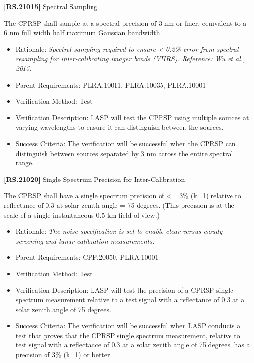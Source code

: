 \documentclass[12pt,oneside,oldfontcommands]{memoir}
\begin{document}
\textbf{[RS.21015]} Spectral Sampling

The \gls{CPRSP} shall \gls{sample} at a spectral precision of 3 nm or finer, equivalent to a 6 nm full width half maximum Gaussian bandwidth.

\begin{itemize}
\item{} Rationale: \emph{Spectral sampling required to ensure < 0.2\% error from spectral resampling for inter-calibrating imager bands (VIIRS). Reference: Wu et al., 2015.}

\item{} Parent Requirements: PLRA.10011, PLRA.10035, PLRA.10001

\item{} Verification Method: Test

\item{} Verification Description: \gls{LASP} will \gls{test} the \gls{CPRSP} using multiple sources at varying wavelengths to ensure it can distinguish between the sources.

\item{} Success Criteria: The verification will be successful when the \gls{CPRSP} can distinguish between sources separated by 3 nm across the entire spectral range.

\end{itemize}

\textbf{[RS.21020]} Single Spectrum Precision for Inter-Calibration

The \gls{CPRSP} shall have a single spectrum precision of <= 3\% (k=1) relative to reflectance of 0.3 at solar zenith angle = 75 degrees. (This precision is at the scale of a single instantaneous 0.5 km field of view.)

\begin{itemize}
\item{} Rationale: \emph{The noise specification is set to enable clear versus cloudy screening and lunar calibration measurements.}

\item{} Parent Requirements: \gls{CPF}.20050, PLRA.10001

\item{} Verification Method: Test

\item{} Verification Description: \gls{LASP} will \gls{test} the precision of a \gls{CPRSP} single spectrum \gls{measure}ment relative to a \gls{test} signal with a reflectance of 0.3 at a solar zenith angle of 75 degrees.

\item{} Success Criteria: The verification will be successful when \gls{LASP} conducts a \gls{test} that proves that the \gls{CPRSP} single spectrum \gls{measure}ment, relative to \gls{test} signal with a reflectance of 0.3 at a solar zenith angle of 75 degrees, has a precision of 3\% (k=1) or better.

\end{itemize}
\end{document}

